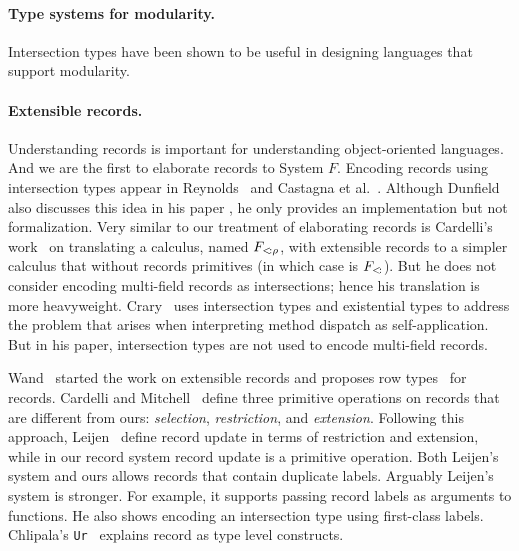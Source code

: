 \paragraph{Type systems for modularity.}

Intersection types have been shown to be useful in designing languages that
support modularity.~\cite{nystrom2006j}

\paragraph{Extensible records.}

Understanding records is important for understanding object-oriented languages.
And we are the first to elaborate records to System $ F $. Encoding records
using intersection types appear in Reynolds~\cite{reynolds1997design} and
Castagna et al.~\cite{castagna1995calculus}. Although Dunfield also discusses
this idea in his paper \cite{dunfield2014elaborating}, he only provides an
implementation but not formalization. Very similar to our treatment of
elaborating records is Cardelli's work~\cite{cardelli1992extensible} on
translating a calculus, named $ F_{<\!: \rho}$, with extensible records to a
simpler calculus that without records primitives (in which case is
$ F_{<\!:} $). But he does not consider encoding multi-field records as
intersections; hence his translation is more heavyweight.
Crary~\cite{crary1998simple} uses intersection types and existential types to
address the problem that arises when interpreting method dispatch as
self-application. But in his paper, intersection types are not used to encode
multi-field records.

Wand~\cite{wand1987complete} started the work on extensible records and proposes
row types~\cite{wand1989type} for records. Cardelli and
Mitchell~\cite{cardelli1990operations} define three primitive operations on
records that are different from ours: \emph{selection}, \emph{restriction}, and
\emph{extension}. Following this approach, Leijen~\cite{leijen2005extensible}
define record update in terms of restriction and extension, while in our record
system record update is a primitive operation. Both Leijen's system and ours
allows records that contain duplicate labels. Arguably Leijen's system is
stronger. For example, it supports passing record labels as arguments to
functions. He also shows encoding an intersection type using first-class labels.
Chlipala's \texttt{Ur}~\cite{chlipala2010ur} explains record as type level
constructs.

